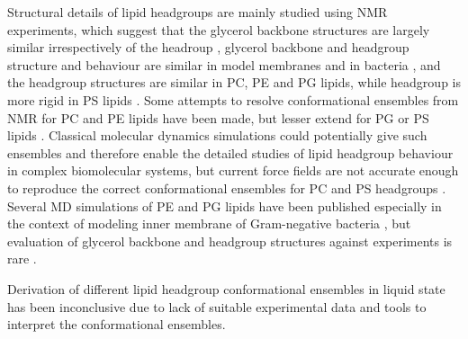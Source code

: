 \documentclass[aps,prl,superscriptaddress,twocolumn]{revtex4}
\begin{document}
Structural details of lipid headgroups are mainly studied using NMR experiments, which
suggest that the glycerol backbone structures are largely similar irrespectively of the headroup \cite{gally81}, 
glycerol backbone and headgroup structure and behaviour are similar in model membranes and in bacteria \cite{gally81,scherer87,seelig90},
and the headgroup structures are similar in PC, PE and PG lipids, while headgroup is more rigid in PS lipids \cite{wohlgemuth80,buldt81}. 
Some attempts to resolve conformational ensembles from NMR for PC and PE lipids have been made,
but lesser extend for PG or PS lipids \cite{seelig77c,davis83,Semchyschyn04}.
Classical molecular dynamics simulations could potentially give such ensembles and therefore enable
the detailed studies of lipid headgroup behaviour in complex biomolecular systems, but current
force fields are not accurate enough to reproduce the correct conformational ensembles for PC and PS headgroups \cite{botan15,antila19}.
Several MD simulations of PE and PG lipids have been published especially in the context of modeling
inner membrane of Gram-negative
bacteria \cite{devries04,murzyn05,pedersen06,zhao07,gurtovenko08,zhao08,henin09,kukol09,tsai12,dickson12,venable13,dickson14,berglund15}
,
but evaluation of glycerol backbone and headgroup structures against experiments is rare \cite{henin09}.

Derivation of different lipid headgroup conformational ensembles in liquid state has been
inconclusive due to lack of suitable experimental data and tools to interpret the conformational ensembles.
\end{document}
